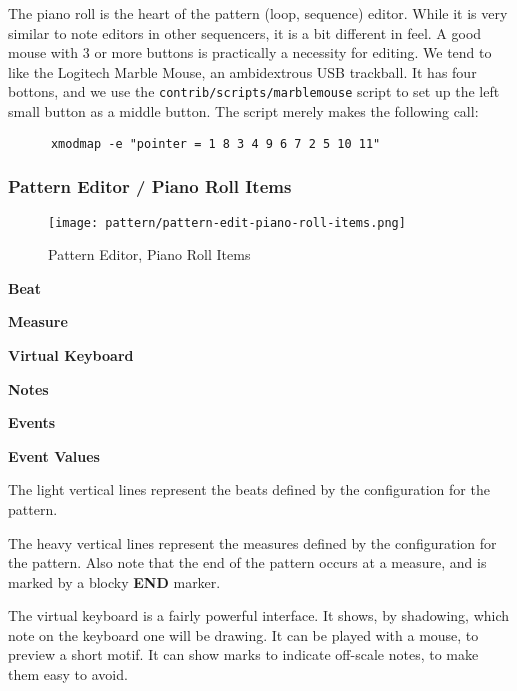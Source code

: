    The piano roll is the heart of the pattern (loop, sequence) editor.
   While it is very similar to note editors in other sequencers, it is a bit
   different in feel.  A good mouse with 3 or more buttons is practically a
   necessity for editing.  We tend to like the Logitech Marble Mouse, an
   ambidextrous USB trackball.  It has four bottons, and we use the
   \texttt{contrib/scripts/marblemouse} script to set up the left small
   button as a middle button.  The script merely makes the following call:

   \begin{verbatim}
      xmodmap -e "pointer = 1 8 3 4 9 6 7 2 5 10 11"
   \end{verbatim}

\subsubsection{Pattern Editor / Piano Roll Items}
\label{subsubsec:seq24_pattern_editor_piano_roll_items}

\begin{figure}[H]
   \centering 
   \texttt{[image: pattern/pattern-edit-piano-roll-items.png]}
   \caption{Pattern Editor, Piano Roll Items}
   \label{fig:pattern_editor_piano_roll_items}
\end{figure}

   \begin{enumber}
      \item \textbf{Beat}
      \item \textbf{Measure}
      \item \textbf{Virtual Keyboard}
      \item \textbf{Notes}
      \item \textbf{Events}
      \item \textbf{Event Values}
   \end{enumber}

   \setcounter{ItemCounter}{0}      %

   The light vertical lines represent the beats defined by the configuration
   for the pattern.

   The heavy vertical lines represent the measures defined by the
   configuration for the pattern.
   Also note that the end of the pattern
   occurs at a measure, and is marked by a blocky \textbf{END} marker.

   The virtual keyboard is a fairly powerful interface.  It shows,
   by shadowing, which note on the keyboard one will be drawing. It can be
   played with a mouse, to preview a short motif.
   It can show marks to indicate off-scale notes, to make them easy to
   avoid.

